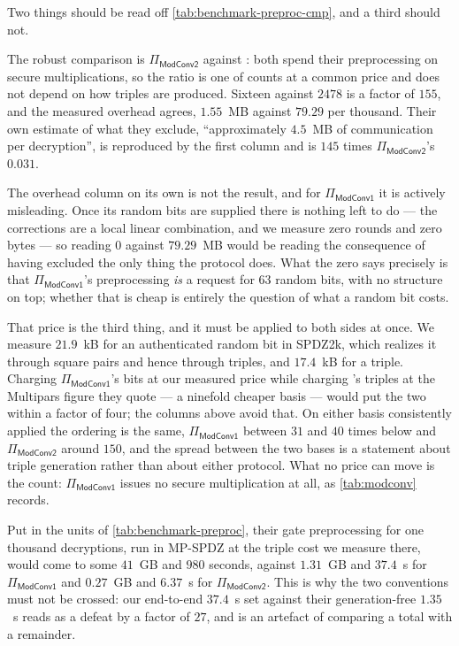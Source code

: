 Two things should be read off \cref{tab:benchmark-preproc-cmp}, and a third should not.

The robust comparison is $\Pi_\mathsf{ModConv2}$ against \cite{CCS:ZZLP25}: both spend their preprocessing on secure multiplications, so the ratio is one of counts at a common price and does not depend on how triples are produced.
Sixteen against $2478$ is a factor of $155$, and the measured overhead agrees, $1.55$~MB against $79.29$ per thousand.
Their own estimate of what they exclude, ``approximately $4.5$~MB of communication per decryption'', is reproduced by the first column and is $145$ times $\Pi_\mathsf{ModConv2}$'s $0.031$.

The overhead column on its own is not the result, and for $\Pi_\mathsf{ModConv1}$ it is actively misleading.
Once its random bits are supplied there is nothing left to do --- the corrections are a local linear combination, and we measure zero rounds and zero bytes --- so reading $0$ against $79.29$~MB would be reading the consequence of having excluded the only thing the protocol does.
What the zero says precisely is that $\Pi_\mathsf{ModConv1}$'s preprocessing \emph{is} a request for $63$ random bits, with no structure on top; whether that is cheap is entirely the question of what a random bit costs.

That price is the third thing, and it must be applied to both sides at once.
We measure $21.9$~kB for an authenticated random bit in SPDZ2k, which realizes it through square pairs and hence through triples, and $17.4$~kB for a triple.
Charging $\Pi_\mathsf{ModConv1}$'s bits at our measured price while charging \cite{CCS:ZZLP25}'s triples at the Multipars figure they quote --- a ninefold cheaper basis --- would put the two within a factor of four; the columns above avoid that.
On either basis consistently applied the ordering is the same, $\Pi_\mathsf{ModConv1}$ between $31$ and $40$ times below and $\Pi_\mathsf{ModConv2}$ around $150$, and the spread between the two bases is a statement about triple generation rather than about either protocol.
What no price can move is the count: $\Pi_\mathsf{ModConv1}$ issues no secure multiplication at all, as \cref{tab:modconv} records.

Put in the units of \cref{tab:benchmark-preproc}, their gate preprocessing for one thousand decryptions, run in MP-SPDZ at the triple cost we measure there, would come to some $41$~GB and $980$ seconds, against $1.31$~GB and $37.4$~s for $\Pi_\mathsf{ModConv1}$ and $0.27$~GB and $6.37$~s for $\Pi_\mathsf{ModConv2}$.
This is why the two conventions must not be crossed: our end-to-end $37.4$~s set against their generation-free $1.35$~s reads as a defeat by a factor of $27$, and is an artefact of comparing a total with a remainder.

